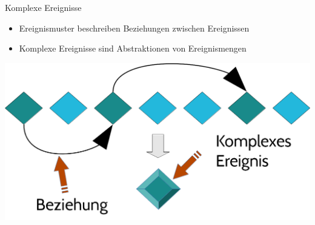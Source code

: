 \documentclass{beamer}
\begin{document}
\begin{frame}{Komplexe Ereignisse}

\begin{exampleblock}{}
    \begin{itemize}
        \item Ereignismuster beschreiben Beziehungen zwischen Ereignissen
        \item Komplexe Ereignisse sind Abstraktionen von Ereignismengen
    \end{itemize}
\end{exampleblock}

\begin{center}
    \includegraphics[scale=0.3]{img/02_cep}
\end{center}

\end{frame}
\end{document}
